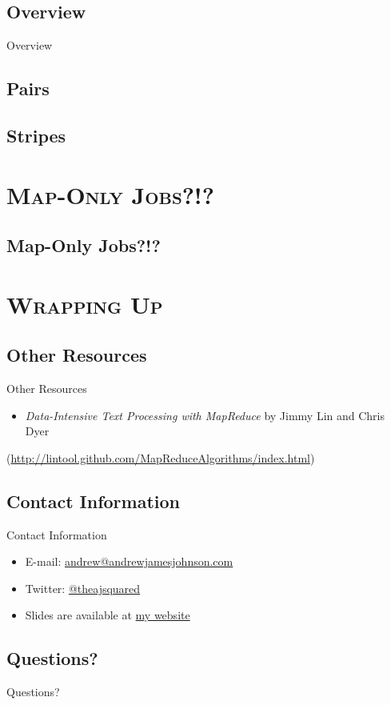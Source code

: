 \documentclass[xcolor=x11names,compress]{beamer}
\renewcommand{\(}{\begin{columns}}
\renewcommand{\)}{\end{columns}}
\newcommand{\<}[1]{\begin{column}{#1}}
\renewcommand{\>}{\end{column}}
\begin{document}
\subsection{Overview}
\begin{frame}{Overview}
  
\end{frame}

\subsection{Pairs}

\subsection{Stripes}

\section{\scshape Map-Only Jobs?!?}

\subsection{Map-Only Jobs?!?}

\section{\scshape Wrapping Up}

\subsection{Other Resources}
\begin{frame}{Other Resources}
  \begin{itemize}
  \item \emph{Data-Intensive Text Processing with MapReduce} by Jimmy
    Lin and Chris Dyer
  \end{itemize}
  (\url{http://lintool.github.com/MapReduceAlgorithms/index.html})
\end{frame}

\subsection{Contact Information}
\begin{frame}{Contact Information}
  \begin{itemize}
  \item E-mail: \href{mailto:andrew@andrewjamesjohnson.com}{andrew@andrewjamesjohnson.com}
  \item Twitter: \href{http://twitter.com/theajsquared}{@theajsquared}
  \item Slides are available at \href{}{my website}
  \end{itemize}
\end{frame}

\subsection{Questions?}
\begin{frame}
  \Huge
  Questions?
\end{frame}
\end{document}
